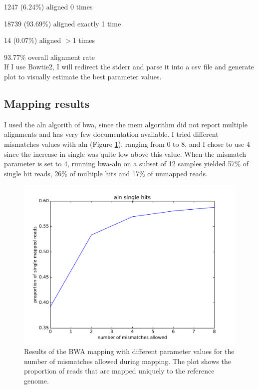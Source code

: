 \documentclass[10pt,a4paper]{report}
\begin{document}
    1247 (6.24\%) aligned 0 times
    
    18739 (93.69\%) aligned exactly 1 time
    
    14 (0.07\%) aligned $>$1 times
    
93.77\% overall alignment rate
\vspace{10px}\\
If I use Bowtie2, I will redirect the stderr and parse it into a csv file and generate plot to visually estimate the best parameter values.

\subsection{Mapping results}

I used the aln algorith of bwa, since the mem algorithm did not report multiple alignments and has very few documentation available. I tried different mismatches values with aln (Figure \ref{map_results}), ranging from 0 to 8, and I chose to use 4 since the increase in single was quite low above this value. When the mismatch parameter is set to 4, running bwa-aln on a subset of 12 samples yielded 57\% of single hit reads, 26\% of multiple hits and 17\% of unmapped reads.

\begin{figure}[h]
\includegraphics[scale=0.5]{param_space/mapstats}
\caption{Results of the BWA mapping with different parameter values for the number of mismatches allowed during mapping. The plot shows the proportion of reads that are mapped uniquely to the reference genome.}
\label{map_results}
\end{figure}
\end{document}
